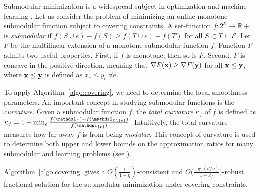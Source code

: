 Submodular minimization is a widespread subject in optimization and machine learning \cite{IwataFleischer01:A-combinatorial-strongly,Bachothers13:Learning-with,Bach16:Submodular-functions:,BalkanskiSinger:2020}. Let us consider the problem of minimizing an online monotone submodular function subject to covering constraints.
A set-function $f: 2^{\mathcal{E}} \rightarrow \mathbb{R}+$ is \emph{submodular} if
$f(S \cup e) - f(S) \geq f(T \cup e) - f(T)$ for all $S \subset T \subseteq \mathcal{E}$.
Let $F$ be the multilinear extension of a monotone submodular function $f$. Function $F$
admits two useful properties. First, if $f$ is monotone, then so is $F$. Second, $F$ is concave in
the positive direction, meaning that $\nabla F(\mathbf{x}) \geq \nabla F(\mathbf{y})$ for all $\mathbf{x} \leq \mathbf{y}$, where $\mathbf{x} \leq \mathbf{y}$ is defined as $x_{e} \leq y_{e} ~\forall e$.

To apply Algorithm~\ref{algo:covering}, we need to determine the local-smoothness parameters.
An important concept in studying submodular functions is the \emph{curvature}. Given a submodular
function $f$, the \emph{total curvature} $\kappa_{f}$ \cite{ConfortiCornuejols84:Submodular-set-functions} of $f$ is defined as
$
\kappa_{f} = 1 - \min_{e} \frac{f(\one_{\mathcal{E}}) - f(\one_{\mathcal{E} \setminus \{e\}})}{f(\one_{\{e\}})}.
$
Intuitively, the total curvature measures how far away $f$ is from being \emph{modular}. This concept of
curvature is used to determine both upper and lower bounds on the approximation ratios
for many submodular and learning problems (see \cite{ConfortiCornuejols84:Submodular-set-functions,GoemansHarvey09:Approximating-submodular,BalcanHarvey12:Learning-Submodular,Vondrak10:Submodularity-and-Curvature:,IyerJegelka13:Curvature-and-optimal,SviridenkoVondrak17:Optimal-approximation}).

\begin{proposition}
Algorithm~\ref{algo:covering} gives a
$O(\frac{1}{1 - \eta})$-consistent and $O\bigl( \frac{\log (d/\eta)}{1 - \kappa_{f}} \bigr)$-robust fractional  solution
for the submodular minimization under covering constraints.
\end{proposition}
